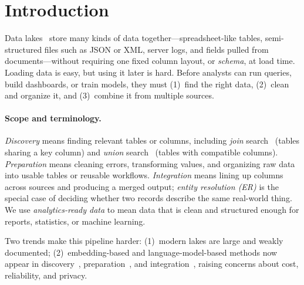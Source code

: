 \documentclass[sigconf]{acmart}
\begin{document}




\maketitle

\section{Introduction}
Data lakes~\cite{10.1145/3555041.3589409,10.14778/3750601.3750694} store many kinds of data together---spreadsheet-like tables, semi-structured files such as JSON or XML, server logs, and fields pulled from documents---without requiring one fixed column layout, or \emph{schema}, at load time.
Loading data is easy, but using it later is hard.
Before analysts can run queries, build dashboards, or train models, they must (1)~find the right data, (2)~clean and organize it, and (3)~combine it from multiple sources.

\paragraph{Scope and terminology.}
\emph{Discovery} means finding relevant tables or columns, including \emph{join} search~\cite{10.1145/3555041.3589409} (tables sharing a key column) and \emph{union} search~\cite{10.14778/3750601.3750694} (tables with compatible columns). \emph{Preparation} means cleaning errors, transforming values, and organizing raw data into usable tables or reusable workflows. \emph{Integration} means lining up columns across sources and producing a merged output; \emph{entity resolution (ER)} is the special case of deciding whether two records describe the same real-world thing. We use \emph{analytics-ready data} to mean data that is clean and structured enough for reports, statistics, or machine learning.

Two trends make this pipeline harder: (1)~modern lakes are large and weakly documented; (2)~embedding-based and language-model-based methods now appear in discovery~\cite{10.14778/3659437.3659461}, preparation~\cite{10.14778/3611540.3611624}, and integration~\cite{10.14778/3742728.3742757}, raising concerns about cost, reliability, and privacy.
\end{document}
